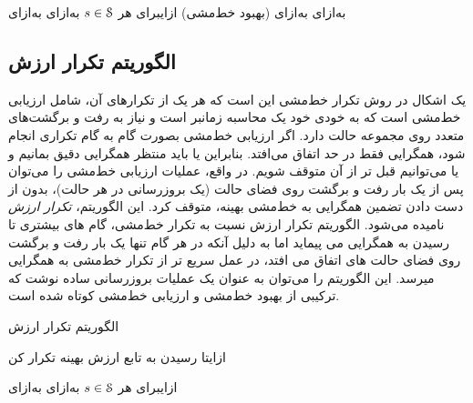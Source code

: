 ‌به‌ازای
‌به‌ازای
(بهبود خط‌مشی)
‌ازای{برای هر $s \in \EuScript{S}$}
‌به‌ازای
‌به‌ازای


\subsection{الگوریتم تکرار ارزش}
یک اشکال در روش تکرار خط‌مشی این است که هر یک از تکرارهای آن، شامل ارزیابی خط‌مشی است که
به خودی خود یک محاسبه زمان\nf بر است و نیاز به رفت و برگشت‌های متعدد روی مجموعه حالت دارد. اگر
ارزیابی خط‌مشی بصورت گام به گام تکراری انجام شود، همگرایی فقط در حد اتفاق می‌افتد. بنابراین یا باید منتظر همگرایی دقیق بمانیم و یا می‌توانیم قبل تر از آن متوقف شویم. 
در واقع، عملیات ارزیابی خط‌مشی را می‌توان پس از یک بار رفت و برگشت روی فضای حالت (یک بروزرسانی در هر حالت)،  بدون از دست دادن تضمین همگرایی به خط‌مشی بهینه، متوقف کرد. 
این الگوریتم،
\textit{تکرار ارزش}
 نامیده می‌شود. الگوریتم تکرار ارزش نسبت به تکرار خط‌مشی، گام های بیشتری تا رسیدن به همگرایی می پیماید اما به دلیل آنکه در هر گام تنها یک بار رفت و برگشت روی فضای حالت های اتفاق می افتد، در عمل سریع تر از تکرار خط‌مشی به همگرایی می\nf رسد. این الگوریتم
را می‌توان به عنوان یک عملیات بروزرسانی ساده نوشت که ترکیبی از بهبود خط‌مشی و ارزیابی خط‌مشی کوتاه شده است.



{الگوریتم تکرار ارزش}

‌ازای{تا رسیدن به تابع ارزش بهینه تکرار کن}

‌ازای{برای هر $s \in \EuScript{S}$}
‌به‌ازای
‌به‌ازای


